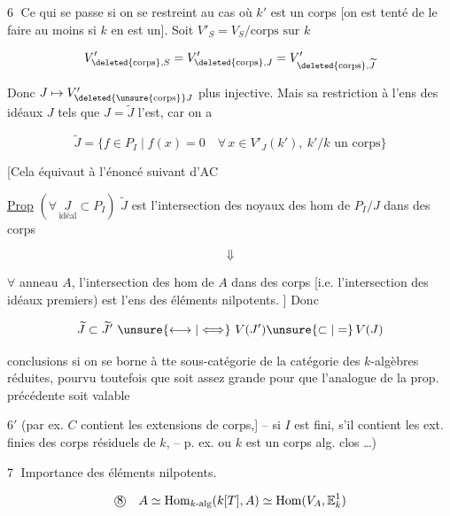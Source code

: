 
\textcircled{6} Ce qui se passe si on se restreint au cas où $k'$ est un corps [on est tenté de le faire au moins si $k$ en est un].  Soit $V'_S=V_S/\text{corps sur }k$

\[
V^{\prime}_{\deleted{\mathrm{corps}},S}=V^{\prime}_{\deleted{\mathrm{corps}},J}=V^{\prime}_{\deleted{\mathrm{corps}},\widetilde J}
\]

Donc $J\mapsto V^{\prime}_{\deleted{\unsure{\mathrm{corps}}}J}$ plus injective. Mais sa restriction à l'ens des idéaux  $J$ tels que $J=\widetilde J$ l'est, car on a

\[
\widetilde J=\{f\in P_I\mid f(x)=0\quad\forall\,x\in V'_J(k'),\ k'/k\text{ un corps}\}
\]

[Cela  équivaut à l'énoncé suivant d'AC

\uline{Prop} $(\forall\,\underset{\text{idéal}}J\subset P_I)$ $\widetilde J$ est l'intersection des noyaux des hom de $P_I/J$ dans des corps

\[
\Downarrow
\]

$\forall$ anneau $A$, l'intersection des hom de $A$ dans des corps [i.e. l'intersection des idéaux premiers) est l'ens des éléments nilpotents. ] Donc

\[
\widetilde J\subset\widetilde J'\ \unsure{\longleftrightarrow|\Longleftrightarrow}\ V(J')\unsure{\subset|=}\,V(J)
\]

 conclusions  si on se borne à tte sous-catégorie  de la catégorie des $k$-algèbres réduites, pourvu toutefois que  soit assez grande pour que l'analogue de la prop. précédente soit valable

\textcircled{$6'$} (par ex. $C$ contient les extensions de corps,] --  si $I$ est fini, s'il contient les ext. finies des corps résiduels de $k$, -- p. ex. ou  $k$ est un corps alg. clos \ldots)



\textcircled{7} Importance des  éléments nilpotents.

\[
\text{\textcircled{8}}\quad A\simeq\mathrm{Hom}_{k\text{-}\mathrm{alg}}(k[T],A)\simeq\mathrm{Hom}(V_A,\mathbb E_k^1)
\]

